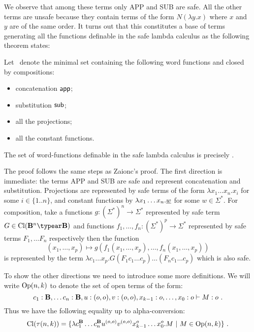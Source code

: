 We observe that among these terms only {\rm APP} and {\rm SUB} are
safe. All the other terms are unsafe because they contain terms of
the form $ N (\lambda y .x)$ where $x$ and $y$ are of the same
order. It turns out that this constitutes a base of terms generating
all the functions definable in the safe lambda calculus as the
following theorem states:
\begin{theorem}
\label{thm:wordfunctions_safely_definable}
Let \safedefset\ denote the minimal set containing the following word functions and closed by compositions:
\begin{itemize}
  \item concatenation ${\sf app}$;
  \item substitution ${\sf sub}$;
  \item all the projections;
  \item all the constant functions.
\end{itemize}
The set of word-functions definable in the safe lambda calculus is
precisely \safedefset.
\end{theorem}

The proof follows the same steps as Zaionc's proof.
The first direction is immediate: the terms {\rm APP} and {\rm SUB} are safe
and represent concatenation and substitution. Projections are represented by safe terms of the form $\lambda x_1 \ldots x_n . x_i$ for some $i\in\{1..n\}$, and constant
functions by $\lambda x_1 \ldots x_n . \underline{w}$ for some $w\in\Sigma^*$.
For composition, take a functions $g:(\Sigma^*)^n \rightarrow \Sigma^*$ represented by safe term $G\in \closedof{\zaiwordtyp^n \typear \zaiwordtyp}$ and functions $f_1,\ldots,f_n :
(\Sigma^*)^p \rightarrow \Sigma^*$ represented by
safe terms $F_1,\ldots F_n$ respectively then the function $$(x_1,\ldots,x_p) \mapsto g(f_1(x_1,\ldots,x_p),\ldots,f_n(x_1,\ldots,x_p))$$ is represented by the term
$\lambda c_1\ldots x_p. G (F_1 c_1 \ldots c_p)\ldots (F_n c_1 \ldots c_p)$ which is also safe.
\bigskip

To show the other directions we need to introduce some more definitions.
We will write ${\rm Op}(n,k)$ to denote the set of open terms
of the form:
$$c_1:\mathbf{B}, \ldots c_n :\mathbf{B}, u:(o,o), v:(o,o), x_{k-1}:o, \ldots, x_0 :o \vdash M : o \ .$$
Thus  we have the following equality up to alpha-conversion:
$$\closedof{\tau(n,k)} = \{ \lambda c_1^\zaiwordtyp \ldots c_n^\zaiwordtyp u^{(o,o)} v^{(o,o)} x_{k-1}^o \ldots x_0^o . M \ | \ M \in \openedof{n}{k}  \} \ .$$

